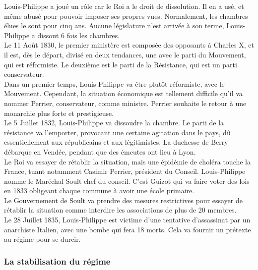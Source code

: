 \documentclass[10pt, a4paper, openany]{book}
\begin{document}
Louis-Philippe a joué un rôle car le Roi a le droit de dissolution. Il en a usé, et même abusé pour pouvoir imposer ses propres vues. Normalement, les chambres élues le sont pour cinq ans. Aucune législature n'est arrivée à son terme, Louis-Philippe a dissout 6 fois les chambres. \\
Le 11 Août 1830, le premier ministère est composée des opposants à Charles X, et il est, dès le départ, divisé en deux tendances, une avec le parti du Mouvement, qui est réformiste. Le deuxième est le parti de la Résistance, qui est un parti conservateur. \\
Dans un premier temps, Louis-Philippe va être plutôt réformiste, avec le Mouvement. Cependant, la situation économique est tellement difficile qu'il va nommer Perrier, conservateur, comme ministre. Perrier souhaite le retour à une monarchie plus forte et prestigieuse. \\
Le 5 Juillet 1832, Louis-Philippe va dissoudre la chambre. Le parti de la résistance va l'emporter, provocant une certaine agitation dans le pays, dû essentiellement aux républicains et aux légitimistes. La duchesse de Berry débarque en Vendée, pendant que des émeutes ont lieu à Lyon. \\
Le Roi va essayer de rétablir la situation, mais une épidémie de choléra touche la France, tuant notamment Casimir Perrier, président du Conseil. Louis-Philippe nomme le Maréchal Soult chef du conseil. C'est Guizot qui va faire voter des lois en 1833 obligeant chaque commune à avoir une école primaire. \\
Le Gouvernement de Soult va prendre des mesures restrictives pour essayer de rétablir la situation comme interdire les associations de plus de 20 membres. \\
Le 28 Juillet 1835, Louis-Philippe est victime d'une tentative d'assassinat par un anarchiste Italien, avec une bombe qui fera 18 morts. Cela va fournir un prétexte au régime pour se durcir. 

\subsubsection{La stabilisation du régime}
\end{document}
